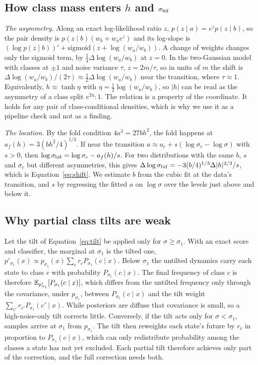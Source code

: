\subsection{How class mass enters $h$ and $\sigma_{\rm bif}$}
\label{app:tanh}

\emph{The asymmetry.} Along an exact log-likelihood ratio $z$, $p(z\mid a)=e^{z}p(z\mid b)$, so the pair density is $p(z\mid b)(w_b+w_ae^{z})$ and its log-slope is $(\log p(z\mid b))'+\mathrm{sigmoid}(z+\log(w_a/w_b))$. A change of weights changes only the sigmoid term, by $\frac14\Delta\log(w_a/w_b)$ at $z=0$. In the two-Gaussian model with classes at $\pm1$ and noise variance $\tau$, $z=2m/\tau$, so in units of $m$ the shift is $\Delta\log(w_a/w_b)/(2\tau)\approx\frac12\Delta\log(w_a/w_b)$ near the transition, where $\tau\approx1$. Equivalently, $h\approx\tanh\eta$ with $\eta=\frac12\log(w_a/w_b)$, so $|h|$ can be read as the asymmetry of a class split $e^{2\eta}:1$. The relation is a property of the coordinate. It holds for any pair of class-conditional densities, which is why we use it as a pipeline check and not as a finding.

\emph{The location.} By the fold condition $4a^3=27bh^2$, the fold happens at $a_f(h)=3(b h^2/4)^{1/3}$. If near the transition $a\approx a_c+s(\log\sigma_c-\log\sigma)$ with $s>0$, then $\log\sigma_{\rm bif}=\log\sigma_c-a_f(h)/s$. For two distributions with the same $b$, $s$ and $\sigma_c$ but different asymmetries, this gives $\Delta\log\sigma_{\rm bif}=-3(b/4)^{1/3}\Delta|h|^{2/3}/s$, which is Equation~\eqref{eq:shift}. We estimate $b$ from the cubic fit at the data's transition, and $s$ by regressing the fitted $a$ on $\log\sigma$ over the levels just above and below it.

\subsection{Why partial class tilts are weak}
\label{app:partial}

Let the tilt of Equation~\eqref{eq:tilt} be applied only for $\sigma\ge\sigma_1$. With an exact score and classifier, the marginal at $\sigma_1$ is the tilted one, $p'_{\sigma_1}(x)\propto p_{\sigma_1}(x)\sum_c r_cP_{\sigma_1}(c\mid x)$. Below $\sigma_1$ the untilted dynamics carry each state to class $c$ with probability $P_{\sigma_1}(c\mid x)$. The final frequency of class $c$ is therefore $\mathbb{E}_{p'_{\sigma_1}}[P_{\sigma_1}(c\mid x)]$, which differs from the untilted frequency only through the covariance, under $p_{\sigma_1}$, between $P_{\sigma_1}(c\mid x)$ and the tilt weight $\sum_{c'}r_{c'}P_{\sigma_1}(c'\mid x)$. While posteriors are diffuse that covariance is small, so a high-noise-only tilt corrects little. Conversely, if the tilt acts only for $\sigma<\sigma_1$, samples arrive at $\sigma_1$ from $p_{\sigma_1}$. The tilt then reweights each state's future by $r_c$ in proportion to $P_{\sigma_1}(c\mid x)$, which can only redistribute probability among the classes a state has not yet excluded. Each partial tilt therefore achieves only part of the correction, and the full correction needs both.

